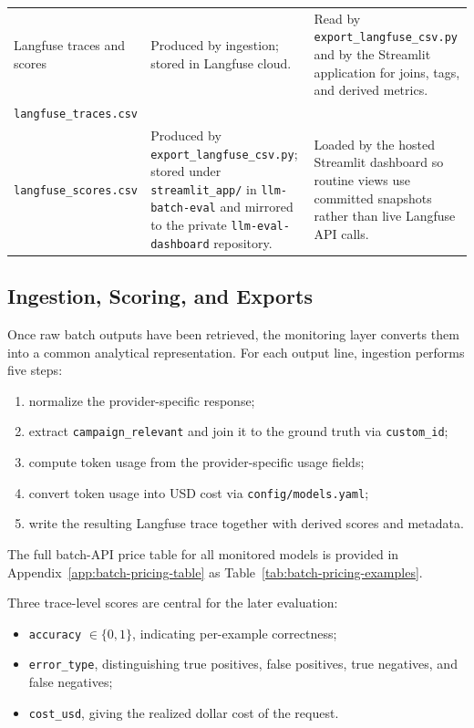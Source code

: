 \begin{table}[htbp]
\begin{tabularx}{\linewidth}{@{}L{3.6cm}Y Y@{}}
Langfuse traces and scores &
Produced by ingestion; stored in Langfuse cloud. &
Read by \texttt{export\_langfuse\_csv.py} and by the Streamlit application for joins, tags, and derived metrics. \\

\texttt{langfuse\_traces.csv}\\
\texttt{langfuse\_scores.csv} &
Produced by \texttt{export\_langfuse\_csv.py}; stored under \texttt{streamlit\_app/} in \texttt{llm-batch-eval} and mirrored to the private \texttt{llm-eval-dashboard} repository. &
Loaded by the hosted Streamlit dashboard so routine views use committed snapshots rather than live Langfuse API calls. \\

\bottomrule
\end{tabularx}
\end{table}


\subsection{Ingestion, Scoring, and Exports}
\label{sec:metrics-dashboard}

Once raw batch outputs have been retrieved, the monitoring layer converts them into a common analytical representation. For each output line, ingestion performs five steps:
\begin{enumerate}
    \item normalize the provider-specific response;
    \item extract \texttt{campaign\_relevant} and join it to the ground truth via \texttt{custom\_id};
    \item compute token usage from the provider-specific usage fields;
    \item convert token usage into USD cost via \texttt{config/models.yaml};
    \item write the resulting Langfuse trace together with derived scores and metadata.
\end{enumerate}

The full batch-API price table for all monitored models is provided in Appendix~\ref{app:batch-pricing-table} as Table~\ref{tab:batch-pricing-examples}.

Three trace-level scores are central for the later evaluation:
\begin{itemize}
    \item \texttt{accuracy} \(\in \{0,1\}\), indicating per-example correctness;
    \item \texttt{error\_type}, distinguishing true positives, false positives, true negatives, and false negatives;
    \item \texttt{cost\_usd}, giving the realized dollar cost of the request.
\end{itemize}

